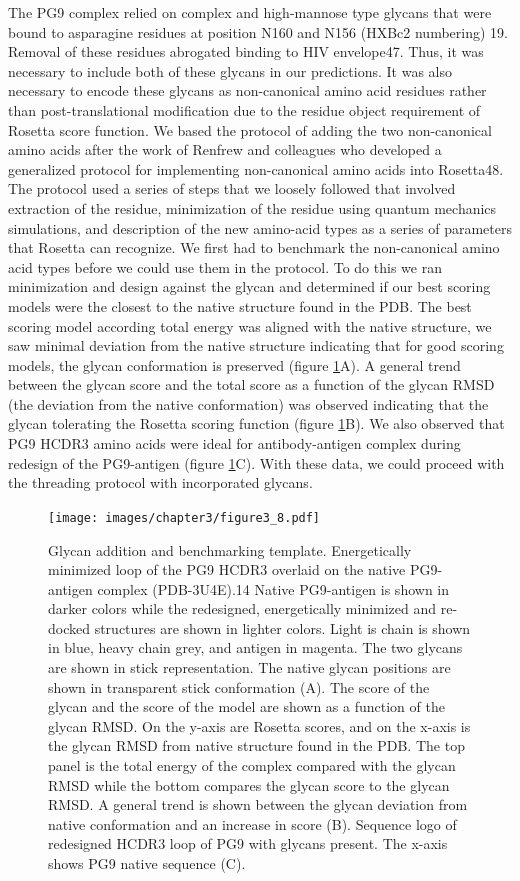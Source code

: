 The PG9 complex relied on complex and high-mannose type glycans that were bound to asparagine residues at position N160 and N156 (HXBc2 numbering) 19. Removal of these residues abrogated binding to HIV envelope47. Thus, it was necessary to include both of these glycans in our predictions. It was also necessary to encode these glycans as non-canonical amino acid residues rather than post-translational modification due to the residue object requirement of Rosetta score function. We based the protocol of adding the two non-canonical amino acids after the work of Renfrew and colleagues who developed a generalized protocol for implementing non-canonical amino acids into Rosetta48. The protocol used a series of steps that we loosely followed that involved extraction of the residue, minimization of the residue using quantum mechanics simulations, and description of the new amino-acid types as a series of parameters that Rosetta can recognize. We first had to benchmark the non-canonical amino acid types before we could use them in the protocol. To do this we ran minimization and design against the glycan and determined if our best scoring models were the closest to the native structure found in the PDB. The best scoring model according total energy was aligned with the native structure, we saw minimal deviation from the native structure indicating that for good scoring models, the glycan conformation is preserved (figure \ref{fig:figure3_8}A). A general trend between the glycan score and the total score as a function of the glycan RMSD (the deviation from the native conformation) was observed indicating that the glycan tolerating the Rosetta scoring function (figure \ref{fig:figure3_8}B). We also observed that PG9 HCDR3 amino acids were ideal for antibody-antigen complex during redesign of the PG9-antigen (figure \ref{fig:figure3_8}C). With these data, we could proceed with the threading protocol with incorporated glycans.

\begin{figure}
   \centering
   \texttt{[image: images/chapter3/figure3\_8.pdf]} %
   \caption[Glycan Addition and Benchmarking Template]{Glycan addition and benchmarking template. Energetically minimized loop of the PG9 HCDR3 overlaid on the native PG9-antigen complex (PDB-3U4E).14 Native PG9-antigen is shown in darker colors while the redesigned, energetically minimized and re-docked structures are shown in lighter colors. Light is chain is shown in blue, heavy chain grey, and antigen in magenta. The two glycans are shown in stick representation. The native glycan positions are shown in transparent stick conformation (A). The score of the glycan and the score of the model are shown as a function of the glycan RMSD. On the y-axis are Rosetta scores, and on the x-axis is the glycan RMSD from native structure found in the PDB. The top panel is the total energy of the complex compared with the glycan RMSD while the bottom compares the glycan score to the glycan RMSD. A general trend is shown between the glycan deviation from native conformation and an increase in score (B). Sequence logo of redesigned HCDR3 loop of PG9 with glycans present. The x-axis shows PG9 native sequence (C).}
   \label{fig:figure3_8}
\end{figure}


